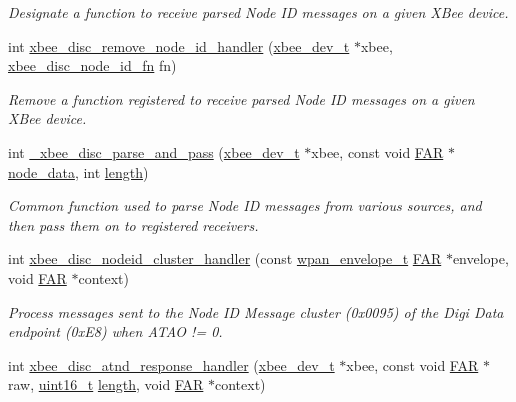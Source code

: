 \begin{DoxyCompactItemize}
\begin{DoxyCompactList}\small\item\em Designate a function to receive parsed Node I\-D messages on a given X\-Bee device. \end{DoxyCompactList}\item 
int \hyperlink{group__xbee__discovery_ga091ae347ddae0bd1b54948714e9d6933}{xbee\-\_\-disc\-\_\-remove\-\_\-node\-\_\-id\-\_\-handler} (\hyperlink{structxbee__dev__t}{xbee\-\_\-dev\-\_\-t} $\ast$xbee, \hyperlink{group__xbee__device_ga55de36532265a72bffa969d5353800d7}{xbee\-\_\-disc\-\_\-node\-\_\-id\-\_\-fn} fn)
\begin{DoxyCompactList}\small\item\em Remove a function registered to receive parsed Node I\-D messages on a given X\-Bee device. \end{DoxyCompactList}\item 
int \hyperlink{group__xbee__discovery_ga8db9bd798e5fb2f6c75037e0e9d3faff}{\-\_\-xbee\-\_\-disc\-\_\-parse\-\_\-and\-\_\-pass} (\hyperlink{structxbee__dev__t}{xbee\-\_\-dev\-\_\-t} $\ast$xbee, const void \hyperlink{group__hal_gaef060b3456fdcc093a7210a762d5f2ed}{F\-A\-R} $\ast$\hyperlink{group__xbee__discovery_ga85b75c5bbcd6d39fb6e2802f35f926ff}{node\-\_\-data}, int \hyperlink{group__zdo_gab2b3adeb2a67e656ff030b56727fd0ac}{length})
\begin{DoxyCompactList}\small\item\em Common function used to parse Node I\-D messages from various sources, and then pass them on to registered receivers. \end{DoxyCompactList}\item 
int \hyperlink{group__xbee__discovery_ga20bc82e8efc243e295c99c23948bed3b}{xbee\-\_\-disc\-\_\-nodeid\-\_\-cluster\-\_\-handler} (const \hyperlink{structwpan__envelope__t}{wpan\-\_\-envelope\-\_\-t} \hyperlink{group__hal_gaef060b3456fdcc093a7210a762d5f2ed}{F\-A\-R} $\ast$envelope, void \hyperlink{group__hal_gaef060b3456fdcc093a7210a762d5f2ed}{F\-A\-R} $\ast$context)
\begin{DoxyCompactList}\small\item\em Process messages sent to the Node I\-D Message cluster (0x0095) of the Digi Data endpoint (0x\-E8) when A\-T\-A\-O != 0. \end{DoxyCompactList}\item 
int \hyperlink{group__xbee__discovery_ga6d1190133ded980a4eeca2034508c8a5}{xbee\-\_\-disc\-\_\-atnd\-\_\-response\-\_\-handler} (\hyperlink{structxbee__dev__t}{xbee\-\_\-dev\-\_\-t} $\ast$xbee, const void \hyperlink{group__hal_gaef060b3456fdcc093a7210a762d5f2ed}{F\-A\-R} $\ast$raw, \hyperlink{group__hal_ga5a8b2dc9e45a9ee81a94ef304fb62505}{uint16\-\_\-t} \hyperlink{group__zdo_gab2b3adeb2a67e656ff030b56727fd0ac}{length}, void \hyperlink{group__hal_gaef060b3456fdcc093a7210a762d5f2ed}{F\-A\-R} $\ast$context)

\end{DoxyCompactItemize}

